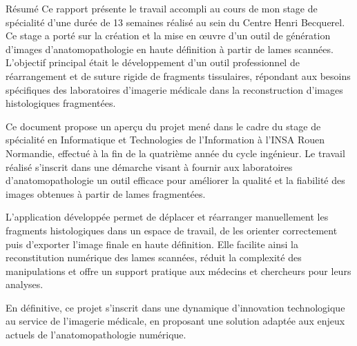\documentclass[12pt,a4paper]{report}
\begin{document}
\listoffigures
\newpage

\listoftables
\newpage

\begin{resume}{Résumé}
Ce rapport présente le travail accompli au cours de mon stage de spécialité d'une durée de 13 semaines réalisé au sein du Centre Henri Becquerel. Ce stage a porté sur la création et la mise en œuvre d'un outil de génération d'images d'anatomopathologie en haute définition à partir de lames scannées. L'objectif principal était le développement d'un outil professionnel de réarrangement et de suture rigide de fragments tissulaires, répondant aux besoins spécifiques des laboratoires d'imagerie médicale dans la reconstruction d'images histologiques fragmentées.

Ce document propose un aperçu du projet mené dans le cadre du stage de spécialité en Informatique et Technologies de l'Information à l'INSA Rouen Normandie, effectué à la fin de la quatrième année du cycle ingénieur. Le travail réalisé s'inscrit dans une démarche visant à fournir aux laboratoires d'anatomopathologie un outil efficace pour améliorer la qualité et la fiabilité des images obtenues à partir de lames fragmentées.

L'application développée permet de déplacer et réarranger manuellement les fragments histologiques dans un espace de travail, de les orienter correctement puis d'exporter l'image finale en haute définition. Elle facilite ainsi la reconstitution numérique des lames scannées, réduit la complexité des manipulations et offre un support pratique aux médecins et chercheurs pour leurs analyses.

En définitive, ce projet s'inscrit dans une dynamique d'innovation technologique au service de l'imagerie médicale, en proposant une solution adaptée aux enjeux actuels de l'anatomopathologie numérique.
\end{resume}

\newpage
\end{document}

